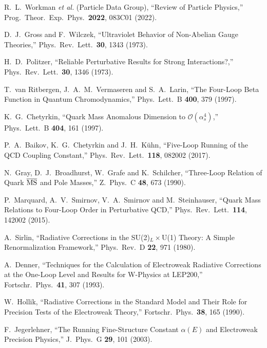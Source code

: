 \documentclass[epjc3]{svjour3}
\begin{document}
\begin{thebibliography}{99}

R.~L.~Workman \textit{et al.} (Particle Data Group),
``Review of Particle Physics,''
Prog.\ Theor.\ Exp.\ Phys.\ \textbf{2022}, 083C01 (2022).

D.~J.~Gross and F.~Wilczek,
``Ultraviolet Behavior of Non-Abelian Gauge Theories,''
Phys.\ Rev.\ Lett.\ \textbf{30}, 1343 (1973).

H.~D.~Politzer,
``Reliable Perturbative Results for Strong Interactions?,'' 
Phys.\ Rev.\ Lett.\ \textbf{30}, 1346 (1973).

T.~van Ritbergen, J.~A.~M.~Vermaseren and S.~A.~Larin,
``The Four-Loop Beta Function in Quantum Chromodynamics,''
Phys.\ Lett.\ B \textbf{400}, 379 (1997).

K.~G.~Chetyrkin,
``Quark Mass Anomalous Dimension to $\mathcal{O}(\alpha_s^4)$,''
Phys.\ Lett.\ B \textbf{404}, 161 (1997).

P.~A.~Baikov, K.~G.~Chetyrkin and J.~H.~K\"uhn,
``Five-Loop Running of the QCD Coupling Constant,''
Phys.\ Rev.\ Lett.\ \textbf{118}, 082002 (2017).

N.~Gray, D.~J.~Broadhurst, W.~Grafe and K.~Schilcher,
``Three-Loop Relation of Quark $\overline{\rm MS}$ and Pole Masses,''
Z.\ Phys.\ C \textbf{48}, 673 (1990).

P.~Marquard, A.~V.~Smirnov, V.~A.~Smirnov and M.~Steinhauser,
``Quark Mass Relations to Four-Loop Order in Perturbative QCD,''
Phys.\ Rev.\ Lett.\ \textbf{114}, 142002 (2015).

A.~Sirlin,
``Radiative Corrections in the SU(2)$_L \times$U(1) Theory: A Simple Renormalization Framework,''
Phys.\ Rev.\ D \textbf{22}, 971 (1980).

A.~Denner,
``Techniques for the Calculation of Electroweak Radiative Corrections at the One-Loop Level and Results for W-Physics at LEP200,''
Fortschr.\ Phys.\ \textbf{41}, 307 (1993).

W.~Hollik,
``Radiative Corrections in the Standard Model and Their Role for Precision Tests of the Electroweak Theory,''
Fortschr.\ Phys.\ \textbf{38}, 165 (1990).

F.~Jegerlehner,
``The Running Fine-Structure Constant $\alpha(E)$ and Electroweak Precision Physics,''
J.\ Phys.\ G \textbf{29}, 101 (2003).


\end{thebibliography}
\end{document}
